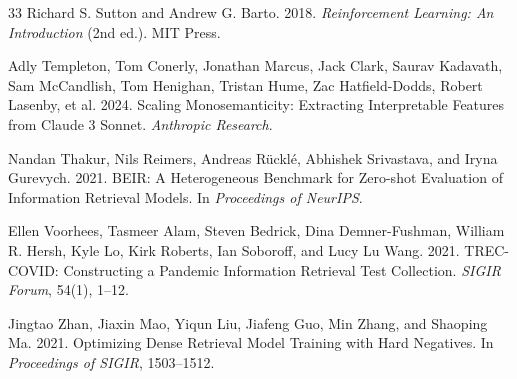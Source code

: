 \documentclass[sigconf]{acmart}
\begin{document}
\begin{thebibliography}{33}
Richard S. Sutton and Andrew G. Barto. 2018. \textit{Reinforcement Learning: An Introduction} (2nd ed.). MIT Press.

Adly Templeton, Tom Conerly, Jonathan Marcus, Jack Clark, Saurav Kadavath, Sam McCandlish, Tom Henighan, Tristan Hume, Zac Hatfield-Dodds, Robert Lasenby, et al. 2024. Scaling Monosemanticity: Extracting Interpretable Features from Claude 3 Sonnet. \textit{Anthropic Research}.

Nandan Thakur, Nils Reimers, Andreas R\"uckl\'e, Abhishek Srivastava, and Iryna Gurevych. 2021. BEIR: A Heterogeneous Benchmark for Zero-shot Evaluation of Information Retrieval Models. In \textit{Proceedings of NeurIPS}.

Ellen Voorhees, Tasmeer Alam, Steven Bedrick, Dina Demner-Fushman, William R. Hersh, Kyle Lo, Kirk Roberts, Ian Soboroff, and Lucy Lu Wang. 2021. TREC-COVID: Constructing a Pandemic Information Retrieval Test Collection. \textit{SIGIR Forum}, 54(1), 1--12.

Jingtao Zhan, Jiaxin Mao, Yiqun Liu, Jiafeng Guo, Min Zhang, and Shaoping Ma. 2021. Optimizing Dense Retrieval Model Training with Hard Negatives. In \textit{Proceedings of SIGIR}, 1503--1512.

\end{thebibliography}
\end{document}
